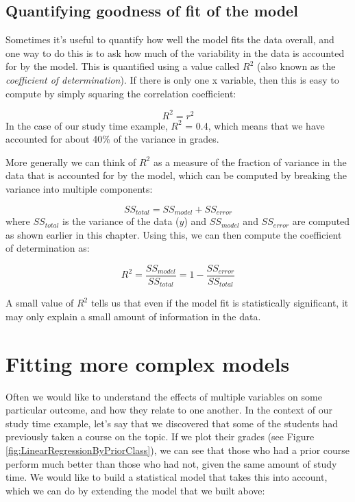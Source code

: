 \documentclass[12pt,]{book}
\theoremstyle{definition}
\theoremstyle{definition}
\theoremstyle{definition}
\theoremstyle{remark}
\begin{document}
\hypertarget{quantifying-goodness-of-fit-of-the-model}{%
\subsection{Quantifying goodness of fit of the model}\label{quantifying-goodness-of-fit-of-the-model}}

Sometimes it's useful to quantify how well the model fits the data overall, and one way to do this is to ask how much of the variability in the data is accounted for by the model. This is quantified using a value called \(R^2\) (also known as the \emph{coefficient of determination}). If there is only one x variable, then this is easy to compute by simply squaring the correlation coefficient:

\[
R^2 = r^2
\]
In the case of our study time example, \(R^2\) = 0.4, which means that we have accounted for about 40\% of the variance in grades.

More generally we can think of \(R^2\) as a measure of the fraction of variance in the data that is accounted for by the model, which can be computed by breaking the variance into multiple components:

\[
SS_{total} = SS_{model} + SS_{error}
\]
where \(SS_{total}\) is the variance of the data (\(y\)) and \(SS_{model}\) and \(SS_{error}\) are computed as shown earlier in this chapter. Using this, we can then compute the coefficient of determination as:

\[
R^2 = \frac{SS_{model}}{SS_{total}} = 1 - \frac{SS_{error}}{SS_{total}}
\]

A small value of \(R^2\) tells us that even if the model fit is statistically significant, it may only explain a small amount of information in the data.

\hypertarget{fitting-more-complex-models}{%
\section{Fitting more complex models}\label{fitting-more-complex-models}}

Often we would like to understand the effects of multiple variables on some particular outcome, and how they relate to one another. In the context of our study time example, let's say that we discovered that some of the students had previously taken a course on the topic. If we plot their grades (see Figure \ref{fig:LinearRegressionByPriorClass}), we can see that those who had a prior course perform much better than those who had not, given the same amount of study time. We would like to build a statistical model that takes this into account, which we can do by extending the model that we built above:
\end{document}
